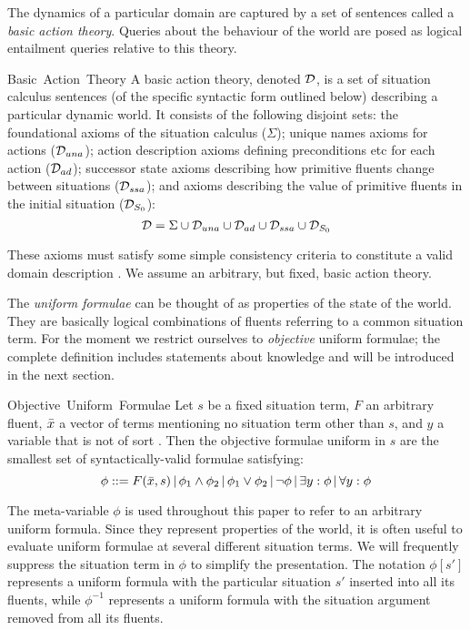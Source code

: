 The dynamics of a particular domain are captured by a set of sentences
called a \emph{basic action theory}. Queries about the behaviour of
the world are posed as logical entailment queries relative to this
theory.

Basic~Action~Theory A basic action theory, denoted $\mathcal{D}$, is a
set of situation calculus sentences (of the specific syntactic form
outlined below) describing a particular dynamic world. It consists
of the following disjoint sets: the foundational axioms of the situation
calculus ($\Sigma$); unique names axioms for actions ($\mathcal{D}_{una}$);
action description axioms defining preconditions etc for each action
($\mathcal{D}_{ad}$); successor state axioms describing how primitive fluents
change between situations ($\mathcal{D}_{ssa}$); and axioms describing the
value of primitive fluents in the initial situation ($\mathcal{D}_{S_{0}}$):\[
\mathcal{D}=\Sigma\cup\mathcal{D}_{una}\cup\mathcal{D}_{ad}\cup\mathcal{D}_{ssa}\cup\mathcal{D}_{S_{0}}\]


These axioms must satisfy some simple consistency criteria to constitute
a valid domain description \cite{pirri99contributions_sitcalc}. We
assume an arbitrary, but fixed, basic action theory.

The \emph{uniform formulae} can be thought of as properties of the
state of the world. They are basically logical combinations of fluents
referring to a common situation term. For the moment we restrict ourselves
to \emph{objective} uniform formulae; the complete definition includes
statements about knowledge and will be introduced in the next section.

Objective~Uniform~Formulae Let $s$ be a fixed situation term, $F$
an arbitrary fluent, $\bar{x}$ a vector of terms mentioning no situation
term other than $s$, and $y$ a variable that is not of sort .
Then the objective formulae uniform in $s$ are the smallest set of
syntactically-valid formulae satisfying:\[
\phi::=F(\bar{x},s)\,|\,\phi_{1}\wedge\phi_{2}\,|\,\phi_{1}\vee\phi_{2}\,|\,\neg\phi\,|\,\exists y:\phi\,|\,\forall y:\phi\]


The meta-variable $\phi$ is used throughout this paper to refer to
an arbitrary uniform formula. Since they represent properties of the
world, it is often useful to evaluate uniform formulae at several
different situation terms. We will frequently suppress the situation
term in $\phi$ to simplify the presentation. The notation $\phi[s']$
represents a uniform formula with the particular situation $s'$ inserted
into all its fluents, while $\phi^{-1}$ represents a uniform formula
with the situation argument removed from all its fluents.

